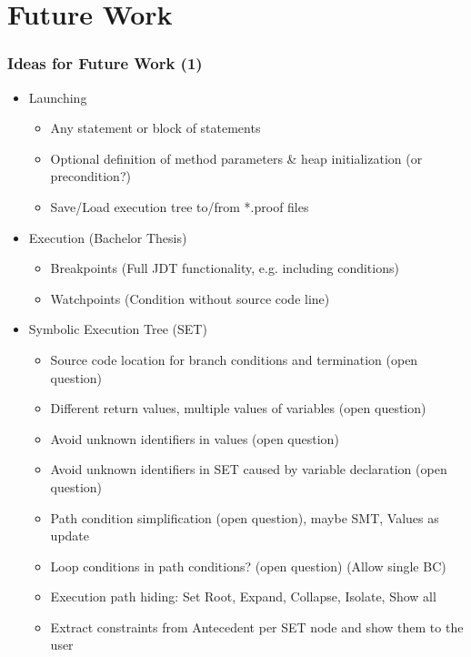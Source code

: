\documentclass[accentcolor=tud9d,colorbacktitle,inverttitle,landscape,english,presentation,t]{tudbeamer}
\begin{document}
\section{Future Work}
   \begin{frame}[t]
		\frametitle{Ideas for Future Work (1)}
      
      \begin{itemize}
         \item Launching
               \begin{itemize}
                  \item Any statement or block of statements
                  \item Optional definition of method parameters \& heap initialization (or precondition?)
                  \item Save/Load execution tree to/from *.proof files
               \end{itemize}
         \item Execution (Bachelor Thesis)
               \begin{itemize}
                  \item Breakpoints (Full JDT functionality, e.g. including conditions)
                  \item Watchpoints (Condition without source code line)
               \end{itemize}
         \item Symbolic Execution Tree (SET)
               \begin{itemize}
                  \item Source code location for branch conditions and termination (open question)
                  \item Different return values, multiple values of variables (open question)
                  \item Avoid unknown identifiers in values (open question)
                  \item Avoid unknown identifiers in SET caused by variable declaration (open question)
                  \item Path condition simplification (open question), maybe SMT, Values as update
                  \item Loop conditions in path conditions? (open question) (Allow single BC)
                  \item Execution path hiding: Set Root, Expand, Collapse, Isolate, Show all
                  \item Extract constraints from Antecedent per SET node and show them to the user
               \end{itemize}
      \end{itemize}
	\end{frame}
   
\end{document}
